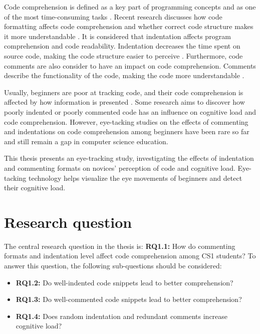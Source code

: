 Code comprehension is defined as a key part of programming concepts and as one of the most time-consuming tasks \cite{javier2021understanding}.
Recent research discusses how code formatting affects code comprehension and whether correct code structure makes it more understandable \cite{andrzejewska2020development}. It is considered that indentation affects program comprehension and code readability. Indentation decreases the time spent on source code, making the code structure easier to perceive \cite{bauer2017indentations}. Furthermore, code comments are also consider to have an impact on code comprehension. Comments describe the functionality of the code, making the code more understandable \cite{bakhuizen2019comments}.
 
Usually, beginners are poor at tracking code, and their code comprehension is affected by how information is presented \cite{robins2003learning}. Some research aims to discover how poorly indented or poorly commented code has an influence on cognitive load and code comprehension.  However, eye-tacking studies on the effects of commenting and indentations on code comprehension among beginners have been rare so far and still remain a gap in computer science education.

  
This thesis presents an eye-tracking study, investigating the effects of indentation and commenting formats on novices’ perception of code and cognitive load. Eye-tacking technology helps visualize the eye movements of beginners and detect their cognitive load. 


\section{Research question}

The central research question in the thesis is: \textbf{RQ1.1:} How do commenting formats and indentation level affect code comprehension among CS1 students? To answer this question, the following sub-questions should be considered:

\begin{itemize}
    \item \textbf{RQ1.2:} Do well-indented code snippets lead to better comprehension?
    \item \textbf{RQ1.3:} Do well-commented code snippets lead to better comprehension?
    \item \textbf{RQ1.4:} Does random indentation and redundant comments increase cognitive load?

\end{itemize}

